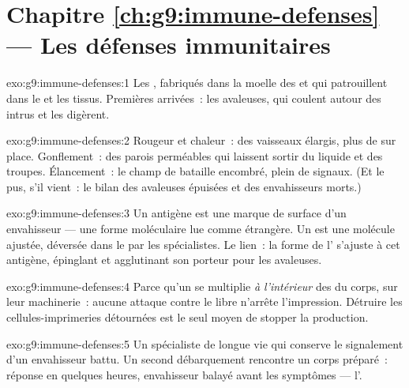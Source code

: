 \section*{Chapitre \ref{ch:g9:immune-defenses} --- Les défenses immunitaires}

\begin{solution}{exo:g9:immune-defenses:1}
Les , fabriqués dans la moelle des  et qui
patrouillent dans le  et les tissus. Premières arrivées~:
les  avaleuses, qui coulent autour des intrus et les
digèrent.
\end{solution}

\begin{solution}{exo:g9:immune-defenses:2}
Rougeur et chaleur~: des vaisseaux élargis, plus de  sur
place. Gonflement~: des parois perméables qui laissent
sortir du liquide et des troupes. Élancement~: le champ de
bataille encombré, plein de signaux. (Et le pus, s'il
vient~: le bilan des avaleuses épuisées et des envahisseurs
morts.)
\end{solution}

\begin{solution}{exo:g9:immune-defenses:3}
Un antigène est une marque de surface d'un envahisseur ---
une forme moléculaire lue comme étrangère. Un  est
une molécule ajustée, déversée dans le  par les
spécialistes. Le lien~: la forme de l' s'ajuste à
cet antigène, épinglant et agglutinant son porteur pour les
avaleuses.
\end{solution}

\begin{solution}{exo:g9:immune-defenses:4}
Parce qu'un  se multiplie \emph{à l'intérieur} des
 du corps, sur leur machinerie~: aucune attaque
contre le  libre n'arrête l'impression. Détruire les
cellules-imprimeries détournées est le seul moyen de
stopper la production.
\end{solution}

\begin{solution}{exo:g9:immune-defenses:5}
Un spécialiste de longue vie qui conserve le signalement
d'un envahisseur battu. Un second débarquement rencontre un
corps préparé~: réponse en quelques heures, envahisseur
balayé avant les symptômes --- l'.
\end{solution}

